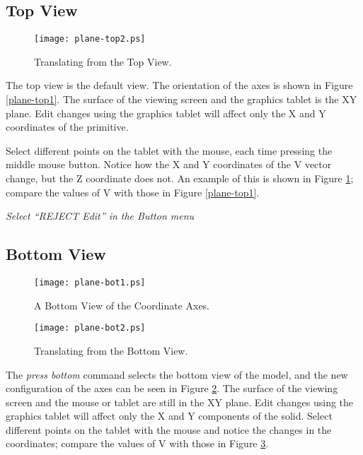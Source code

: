 \subsection{Top View}
\begin{figure}
\centering \texttt{[image: plane-top2.ps]}
\caption{Translating from the Top View.}
\label{plane-top2}
\end{figure}

The top view is the default view.  The orientation of the axes
is shown in Figure \ref{plane-top1}.
The surface of the viewing screen and the graphics tablet is the XY plane.
Edit changes using the graphics tablet will affect only the X and Y
coordinates of the primitive.


Select different points on the tablet with the mouse, each time
pressing the middle mouse button.
Notice how the X and Y coordinates of the V vector change,
but the Z coordinate does not.
An example of this is shown in Figure \ref{plane-top2};
compare the values of V with those in Figure \ref{plane-top1}.

{\em Select ``REJECT Edit'' in the Button menu}

\subsection{Bottom View}
\begin{figure}
\centering \texttt{[image: plane-bot1.ps]}
\caption{A Bottom View of the Coordinate Axes.}
\label{plane-bot1}
\end{figure}
\begin{figure}
\centering \texttt{[image: plane-bot2.ps]}
\caption{Translating from the Bottom View.}
\label{plane-bot2}
\end{figure}


The {\em press bottom} command selects the bottom view of the
model, and the new configuration of the axes can be seen in
Figure \ref{plane-bot1}.
The surface of the viewing screen and the mouse or tablet
are still in the XY plane.
Edit changes using the graphics tablet will affect only the X and Y
components of the solid.
Select different points on the tablet with the mouse and notice the
changes in the coordinates;
compare the values of V with those in Figure \ref{plane-bot2}.

